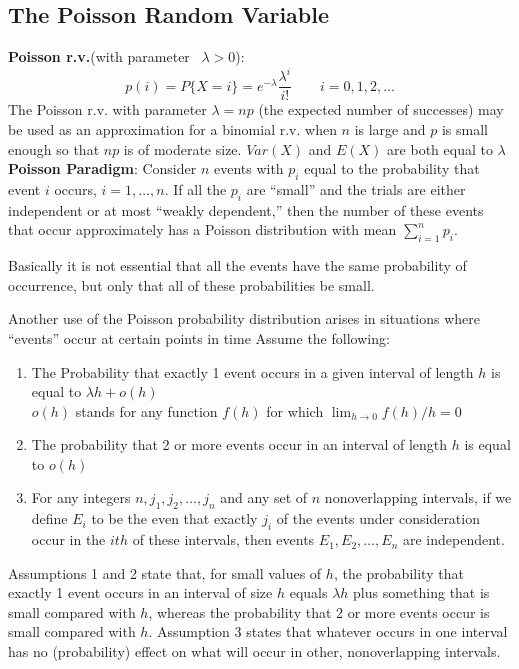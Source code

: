 \documentclass[openany]{book}
\numberwithin{equation}{section}
\begin{document}
\begin{flushleft}
\section{The Poisson Random Variable}
\textbf{Poisson r.v.}(with parameter 
\ $\lambda>0$):
\begin{equation}
\label{poi}
p(i)=P\{X=i\}=e^{-\lambda}\frac{\lambda^i}{i!} \qquad i=0,1,2,\dots
\end{equation}
The Poisson r.v. with parameter $\lambda=np$ (the expected number of successes) may be used as an approximation for a binomial r.v. when $n$ is large and $p$ is small enough so that $np$ is of moderate size.\medbreak
$Var(X)$ and $E(X)$ are both equal to $\lambda$ \medbreak
\textbf{Poisson Paradigm}: Consider $n$ events with $p_i$ equal to the probability that event $i$ occurs, $i=1,\dots,n$. If all the $p_i$ are “small” and the trials are either independent or at most “weakly dependent,” then the number of these events that occur approximately
has a Poisson distribution with mean $\sum_{i=1}^{n}p_i$. \medbreak

Basically it is not essential that all the events have the same probability of occurrence, but only that all of these probabilities be small. \medbreak

Another use of the Poisson probability distribution arises in situations where
“events” occur at certain points in time\medbreak
Assume the following:
\begin{enumerate}
\item The Probability that exactly 1 event occurs in a given interval of length $h$ is equal to $\lambda h+o(h)$ \\
$o(h)$ stands for any function $f(h)$ for which $\lim_{h\to 0}f(h)/h=0$
\item The probability that 2 or more events occur in an interval of length $h$ is equal to $o(h)$ 
\item For any integers $n,j_1,j_2,\dots,j_n$ and any set of $n$ nonoverlapping intervals, if we define $E_i$ to be the even that exactly $j_i$ of the events under consideration occur in the $ith$ of these intervals, then events $E_1,E_2,\dots,E_n$ are independent.
\end{enumerate}
Assumptions 1 and 2 state that, for small values of $h$, the probability
that exactly 1 event occurs in an interval of size $h$ equals $\lambda h$ plus something that is small compared with $h$, whereas the probability that 2 or more events occur is small
compared with $h$.\medbreak
Assumption 3 states that whatever occurs in one interval has no
(probability) effect on what will occur in other, nonoverlapping intervals.\medbreak


\end{flushleft}
\end{document}
